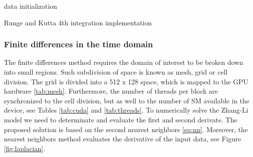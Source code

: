 \begin{algorithm}[H]
 data initialization\;
 \label{log:rk4}
 \caption{Runge and Kutta 4th integration implementation}
\end{algorithm}

\subsubsection{Finite differences in the time domain}

The finite differences method requires the domain of interest to be broken down into small regions. Such subdivision of space is known as mesh, grid or cell division. The grid is divided into a 512 x 128 space, which is mapped to the GPU hardware \ref{tab:mesh}. Furthermore, the number of threads per block are synchronized to the cell division, but as well to the number of SM available in the device, see Tables \ref{tab:cuda} and  \ref{tab:threads}.
To numerically solve the Zhang-Li model we need to determinate and evaluate the first and second derivate. The proposed solution is based on the second nearest neighbors \ref{eq:nn}. Moreover, the nearest neighbors method evaluates the derivative of the input data, see Figure \ref{fig:laplacian}.

